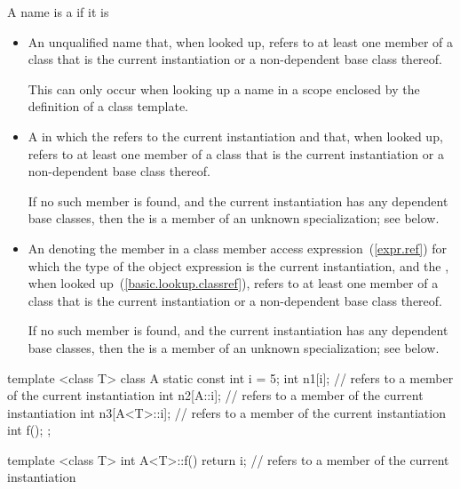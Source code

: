 \pnum
{}%
A name is a
if it is

\begin{itemize}
\item
An unqualified name that, when looked up, refers to
at least one member of a class that is
the current instantiation or a non-dependent base class thereof.
\begin{note}
This can only occur when looking up a name in a scope enclosed by the
definition of a class template.
\end{note}
\item
A
in which the
refers to the current instantiation
and that, when looked up, refers to at least one member of a class that is
the current
instantiation or a non-dependent base class thereof. \begin{note} If no such
member is found, and the current instantiation has any dependent base classes,
then the  is a member of an unknown specialization;
see below. \end{note}

\item
An  denoting the member in a class member access
expression~(\ref{expr.ref}) for which the type of the object expression is the
current instantiation, and the , when looked
up~(\ref{basic.lookup.classref}), refers to at least one member of a class
that is the current
instantiation or a non-dependent base class thereof. \begin{note} If no such
member is found, and the current instantiation has any dependent base classes,
then the  is a member of an unknown specialization;
see below. \end{note}
\end{itemize}

\begin{example}
\begin{codeblock}
template <class T> class A {
  static const int i = 5;
  int n1[i];                    //  refers to a member of the current instantiation
  int n2[A::i];                 //  refers to a member of the current instantiation
  int n3[A<T>::i];              //  refers to a member of the current instantiation
  int f();
};

template <class T> int A<T>::f() {
  return i;                     //  refers to a member of the current instantiation
}
\end{codeblock}
\end{example}

